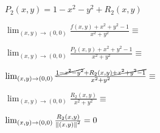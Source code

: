 \documentclass[../practica_05.tex]{subfiles}
\begin{document}
    $ P_2(x,y) = 1 - x^2 - y^2 + R_2(x,y) $

    $\lim_{(x,y) \to (0,0)} \frac{f(x,y)+x^2+y^2-1}{x^2 + y^2} \equiv$

    $\lim_{(x,y) \to (0,0)} \frac{P_2(x,y)+x^2+y^2-1}{x^2 + y^2} \equiv$

    $\lim_{(x,y) \to (0,0)} \frac{\cancel{1 - x^2 - y^2} + R_2(x,y)\cancel{+x^2+y^2-1}}{x^2 + y^2} \equiv$

    $\lim_{(x,y) \to (0,0)} \frac{R_2(x,y)}{x^2 + y^2} \equiv$

    $\lim_{(x,y) \to (0,0)} \frac{R_2(x,y)}{\norm*{(x,y)}^2} = 0$
\end{document}

